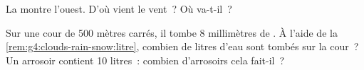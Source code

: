 \begin{exercise}[$\star\star$]\label{exo:g4:clouds-rain-snow:10}
La  montre l'ouest. D'où vient le vent~? Où va-t-il~?
\end{exercise}

\begin{exercise}[$\star\star\star$]\label{exo:g4:clouds-rain-snow:11}
Sur une cour de 500 mètres carrés, il tombe 8 millimètres de . À
l'aide de la \cref{rem:g4:clouds-rain-snow:litre}, combien de litres d'eau
sont tombés sur la cour~? Un arrosoir contient 10 litres~: combien
d'arrosoirs cela fait-il~?
\end{exercise}
